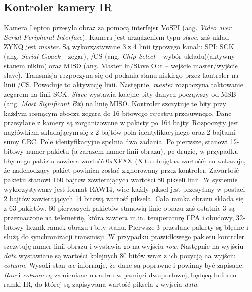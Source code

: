 \subsection{Kontroler kamery IR}
Kamera Lepton przesyła obraz za pomocą interfejsu VoSPI (ang. \textit{Video over Serial Peripheral Interface}). Kamera jest urządzeniem typu \textit{slave}, zaś układ ZYNQ jest \textit{master}. Są wykorzystywane 3 z 4 linii typowego kanału SPI: SCK (ang. \textit{Serial Cloack} – zegar), /CS (ang. \textit{Chip Select} -- wybór układu)(aktywny stanem nikim) oraz MISO (ang. {Master In/Slave Out} – wejście master/wyjście slave).
Transmisja rozpoczyna się od podania stanu niskiego przez kontroler na linii /CS. Powoduje to aktywację linii. Następnie, \textit{master} rozpoczyna taktowanie zegarem na linii SCK. \textit{Slave} wystawia kolejne bity danych począwszy od MSB (ang. \textit{Most Significant Bit}) na linię MISO. Kontroler szczytuje te bity przy każdym rosnącym zboczu zegara do 16 bitowego rejestru przesuwnego.
Dane przesyłane z kamery są zorganizowane w pakiety po 164 bajty. Rozpoczęty jest nagłówkiem składającym się z 2 bajtów pola identyfikacyjnego oraz 2 bajtami sumy CRC. Pole identyfikacyjne spełnia dwa zadania. Po pierwsze, stanowi 12-bitowy numer pakietu (a zarazem numer linii obrazu), po drugie, w przypadku błędnego pakietu zawiera wartość 0xXFXX (X to obojętna wartość) co wskazuje, że nadchodzący pakiet powinien zostać zignorowany przez kontroler. Zawartość pakietu stanowi 160 bajtów zawierających wartości 80 pikseli linii. W systemie wykorzystywany jest format RAW14, więc każdy piksel jest przesyłany w postaci 2 bajtów zawierających 14 bitową wartość piksela.
Cała ramka obrazu składa się z 63 pakietów. 60 pierwszych pakietów stanowią linie obrazu zaś ostatnie 3 są przeznaczone na telemetrię, która zawiera m.in. temperaturę FPA i obudowy, 32-bitowy licznik ramek obrazu i bity stanu.
Pierwsze 3 przesłane pakiety są błędne i służą do synchronizacji transmisji.
W przypadku prawidłowego pakietu kontroler szczytuję numer linii obrazu i wystawia go na wyjściu \textit{row}. Następnie na wyjściu \textit{data} wystawiane są wartości kolejnych 80 bitów wraz z ich pozycją na wyjściu \textit{column}. Wysoki stan \textit{we} informuje, że dane są poprawne i powinny być zapisane.
\textit{Row} i \textit{column} są zamieniane na adres w pamięci dwuportowej, będącą buforem ramki IR, do której są zapisywana wartość piksela z wyjścia \textit{data}.

